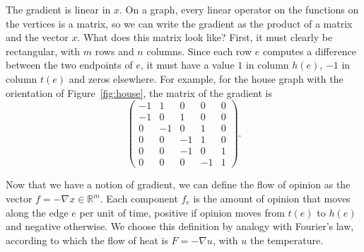 \documentclass[11pt,a4paper]{article}
\theoremstyle{plain}
\theoremstyle{definition}
\newcommand{\R}{\mathbb{R}}
\begin{document}
The gradient is linear in $x$. On a graph, every linear operator on the functions on the vertices is a matrix, so we can write the gradient as the product of a matrix and the vector $x$. What does this matrix look like? First, it must clearly be rectangular, with $m$ rows and $n$ columns. Since each row $e$ computes a difference between  the two endpoints of $e$, it must have a value $1$ in column $h(e)$, $-1$ in column $t(e)$ and zeros elsewhere. For example, for the house graph with the orientation of Figure~\ref{fig:house}, the matrix of the gradient is
\begin{equation}\label{eq:grad}
\begin{pmatrix}
-1& 1& 0& 0& 0\\
-1& 0& 1& 0& 0\\
 0&-1& 0& 1& 0\\
 0& 0&-1& 1& 0\\
 0& 0&-1& 0& 1\\
 0& 0& 0&-1& 1
\end{pmatrix}.
\end{equation}

Now that we have a notion of gradient, we can define the flow of opinion as the vector $f=-\nabla x\in\R^m$. Each component $f_e$ is the amount of opinion that moves along the edge $e$ per unit of time, positive if opinion moves from $t(e)$ to $h(e)$ and negative otherwise. We choose this definition by analogy with Fourier's law, according to which the flow of heat is $F=-\nabla u$, with $u$ the temperature.
\end{document}
